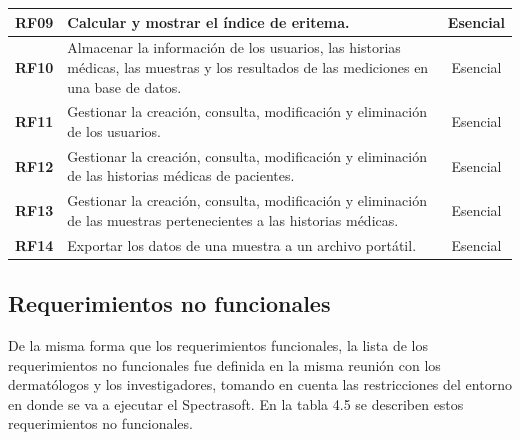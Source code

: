 \begin{table}[h]
\begin{tabulary}{\anchotabla}{|c|J|c|}
			\textbf{RF09} & Calcular y mostrar el \'{i}ndice de eritema. & Esencial\\ \hline

			\textbf{RF10} & Almacenar la informaci\'{o}n de los usuarios, las historias m\'{e}dicas, las muestras y los resultados de las mediciones en una base de datos. & Esencial\\ \hline			

			\textbf{RF11} & Gestionar la creaci\'{o}n, consulta, modificaci\'{o}n y eliminaci\'{o}n de los usuarios. & Esencial\\ \hline
			
			\textbf{RF12} & Gestionar la creaci\'{o}n, consulta, modificaci\'{o}n y eliminaci\'{o}n de las historias m\'{e}dicas de pacientes. & Esencial\\ \hline
			
			\textbf{RF13} & Gestionar la creaci\'{o}n, consulta, modificaci\'{o}n y eliminaci\'{o}n de las muestras pertenecientes a las historias m\'{e}dicas. & Esencial\\ \hline	
			
			\textbf{RF14} & Exportar los datos de una muestra a un archivo port\'{a}til. & Esencial\\ \hline
		\end{tabulary}
	\end{table}
	
\subsection{Requerimientos no funcionales}
	
	De la misma forma que los requerimientos funcionales, la lista de los requerimientos no funcionales fue definida en la misma reuni\'{o}n con los dermat\'{o}logos y los investigadores, tomando en cuenta las restricciones del entorno en donde se va a ejecutar el Spectrasoft. En la tabla 4.5 se describen estos requerimientos no funcionales.
	
